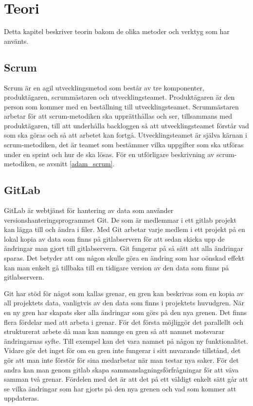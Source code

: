\chapter{Teori}
Detta kapitel beskriver teorin bakom de olika metoder och verktyg som har använts.

\section{Scrum} \label{scrum}
Scrum är en agil utvecklingsmetod som består av tre komponenter, produktägaren, scrummästaren och utvecklingsteamet.
Produktägaren är den person som kommer med en beställning till utvecklingsteamet.
Scrummästaren arbetar för att scrum-metodiken ska upprätthållas och ser, tillsammans med produktägaren, till att underhålla backloggen så att utvecklingsteamet förstår vad som ska göras och så att arbetet kan fortgå.
Utvecklingsteamet är själva kärnan i scrum-metodiken, det är teamet som bestämmer vilka uppgifter som ska utföras under en sprint och hur de ska lösas.
För en utförligare beskrivning av scrum-metodiken, se avsnitt \ref{adam_scrum}.

\section{GitLab}
GitLab är webtjänst för hantering av data som använder versionshanteringsprogrammet Git. De som är medlemmar i ett gitlab projekt kan lägga till och ändra i filer.
Med Git arbetar varje medlem i ett projekt på en lokal kopia av data som finns på gitlabservern för att sedan skicka upp de ändringar man gjort till gitlabservern. Git fungerar på så sätt att alla ändringar sparas. Det betyder att om någon skulle göra en ändring som har oönskad effekt kan man enkelt gå tillbaka till en tidigare version av den data som finns på gitlabservern.

Git har stöd för något som kallas grenar, en gren kan beskrivas som en kopia av all projektets data, vanligtvis av den data som finns i projektets huvudgren. När en ny gren har skapats sker alla ändringar som görs på den nya grenen. Det finns flera fördelar med att arbeta i grenar. För det första möjliggör det parallellt och strukturerat arbete då man kan namnge en gren så att namnet motsvarar ändringarnas syfte. Till exempel kan det vara namnet på någon ny funktionalitet. Vidare gör det inget för om en gren inte fungerar i sitt nuvarande tillstånd, det gör att man inte förstör för sina medarbetar när man testar nya saker. För det andra kan man genom gitlab skapa sammanslagningsförfrågningar för att väva samman två grenar. Fördelen med det är att det på ett väldigt enkelt sätt går att se vilka ändringar som har gjorts på den nya grenen och vad som kommer att uppdateras.

